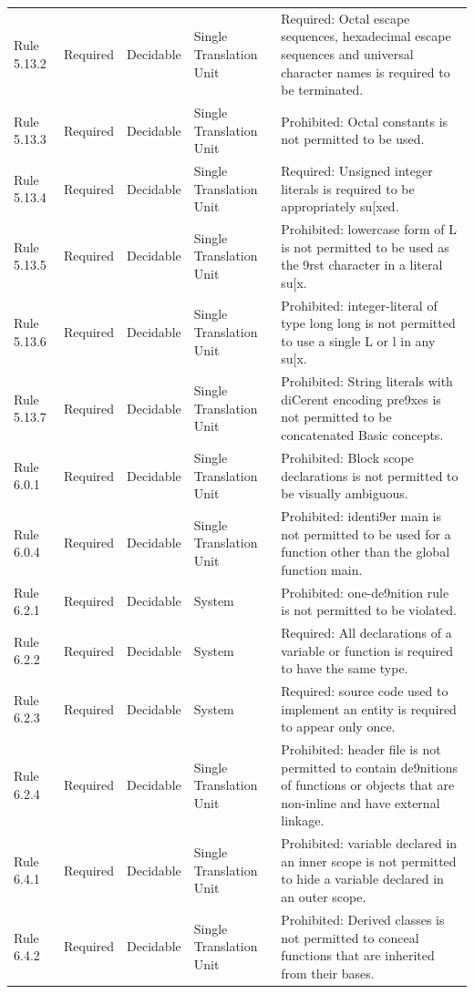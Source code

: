 \documentclass[11pt]{article}
\begin{document}
{\begin{longtable}{@{}P{2.2cm}P{1.7cm}P{2.1cm}P{3.0cm}P{6.7cm}@{}}
Rule 5.13.2 & Required & Decidable & Single Translation Unit & Required: Octal escape sequences, hexadecimal escape sequences and universal character names is required to be terminated. \\
Rule 5.13.3 & Required & Decidable & Single Translation Unit & Prohibited: Octal constants is not permitted to be used. \\
Rule 5.13.4 & Required & Decidable & Single Translation Unit & Required: Unsigned integer literals is required to be appropriately su[xed. \\
Rule 5.13.5 & Required & Decidable & Single Translation Unit & Prohibited: lowercase form of L is not permitted to be used as the 9rst character in a literal su[x. \\
Rule 5.13.6 & Required & Decidable & Single Translation Unit & Prohibited: integer-literal of type long long is not permitted to use a single L or l in any su[x. \\
Rule 5.13.7 & Required & Decidable & Single Translation Unit & Prohibited: String literals with diCerent encoding pre9xes is not permitted to be concatenated Basic concepts. \\
Rule 6.0.1 & Required & Decidable & Single Translation Unit & Prohibited: Block scope declarations is not permitted to be visually ambiguous. \\
Rule 6.0.4 & Required & Decidable & Single Translation Unit & Prohibited: identi9er main is not permitted to be used for a function other than the global function main. \\
Rule 6.2.1 & Required & Decidable & System & Prohibited: one-de9nition rule is not permitted to be violated. \\
Rule 6.2.2 & Required & Decidable & System & Required: All declarations of a variable or function is required to have the same type. \\
Rule 6.2.3 & Required & Decidable & System & Required: source code used to implement an entity is required to appear only once. \\
Rule 6.2.4 & Required & Decidable & Single Translation Unit & Prohibited: header file is not permitted to contain de9nitions of functions or objects that are non-inline and have external linkage. \\
Rule 6.4.1 & Required & Decidable & Single Translation Unit & Prohibited: variable declared in an inner scope is not permitted to hide a variable declared in an outer scope. \\
Rule 6.4.2 & Required & Decidable & Single Translation Unit & Prohibited: Derived classes is not permitted to conceal functions that are inherited from their bases. \\

\end{longtable}}
\end{document}
